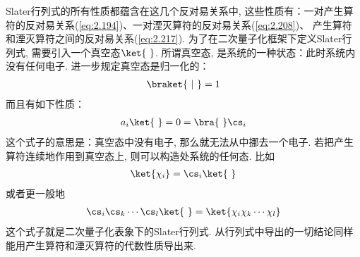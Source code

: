 
Slater行列式的所有性质都蕴含在这几个反对易关系中, 
这些性质有：一对产生算符的反对易关系(\autoref{eq:2.194})、一对湮灭算符的反对易关系(\autoref{eq:2.208})、 产生算符和湮灭算符之间的反对易关系(\autoref{eq:2.217}). 
为了在二次量子化框架下定义Slater行列式, 
需要引入一个真空态$\ket{\,\,}$. 
所谓真空态, 是系统的一种状态：此时系统内没有任何电子. 进一步规定真空态是归一化的：
\begin{align}
\braket{\,\,|\,\,} = 1
\end{align} 
而且有如下性质：
\begin{align}
a_i \ket{\,\,} = 0 = \bra{\,\,} \cs_i
\end{align}
这个式子的意思是：真空态中没有电子, 
那么就无法从中挪去一个电子. 
若把产生算符连续地作用到真空态上, 
则可以构造处系统的任何态. 
比如
\begin{align}
\ket{\chi_i} = \cs_i\ket{\,\,}
\end{align}
或者更一般地
\begin{align}
\cs_i\cs_k\cdots\cs_l\ket{\,\,} = \ket{\chi_i\chi_k\cdots\chi_l}
\end{align}
这个式子就是二次量子化表象下的Slater行列式. 
从行列式中导出的一切结论同样能用产生算符和湮灭算符的代数性质导出来. 


